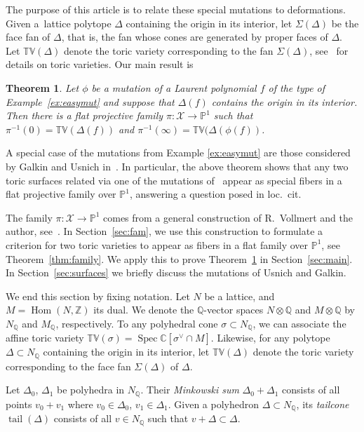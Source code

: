 \documentclass[11pt]{article}
\newcommand{\CC}{\mathbb{C}}
\newcommand{\QQ}{\mathbb{Q}}
\newcommand{\ZZ}{\mathbb Z}
\newcommand{\PP}{\mathbb{P}}
\newcommand{\tv}{\mathbb{TV}}
\newcommand{\cX}{\mathcal{X}}
\DeclareMathOperator{\spec}{Spec}
\DeclareMathOperator{\tail}{tail}
\DeclareMathOperator{\Hom}{Hom}
\newtheorem{Theorem}{Theorem}[section]
 { \theoremstyle{definition}
\newtheorem{Definition}[Theorem]{Definition}
\newtheorem{Example}[Theorem]{Example}
\newtheorem{Remark}[Theorem]{Remark} }
\begin{document}
The purpose of this article is to relate these special mutations to deformations. Given a~lattice polytope $\Delta$ containing the origin in its interior, let
$\Sigma(\Delta)$ be the face fan of $\Delta$, that is, the fan whose cones are generated by proper faces of $\Delta$. Let $\tv(\Delta)$ denote the toric variety corresponding to the fan $\Sigma(\Delta)$, see~\cite{fulton:93a} for details on toric varieties.  Our main result is

\begin{Theorem}\label{thm:main}
	Let $\phi$ be a mutation of a Laurent polynomial $f$ of the type of Example~{\rm \ref{ex:easymut}} and suppose that $\Delta(f)$ contains the origin in its interior. Then there is a flat projective family $\pi\colon \cX\to\PP^1$ such that $\pi^{-1}(0)=\tv(\Delta(f))$ and $\pi^{-1}(\infty)=\tv(\Delta(\phi(f))$.
\end{Theorem}


A special case of the mutations from Example \ref{ex:easymut} are those considered by Galkin and Usnich in~\cite{galkin}. In particular, the above theorem shows that any two toric surfaces related via one of the mutations of~\cite{galkin} appear as special f\/ibers in a f\/lat projective family over $\PP^1$, answering a question posed in loc.~cit.

The family $\pi\colon \cX\to\PP^1$  comes from a general construction of R.~Vollmert and the author, see~\cite{ilten:09b}. In Section~\ref{sec:fam}, we use this construction to formulate a criterion for two toric varieties to appear as f\/ibers in a f\/lat family over $\PP^1$, see Theorem~\ref{thm:family}.
We apply this to prove Theorem~\ref{thm:main} in Section~\ref{sec:main}. In Section~\ref{sec:surfaces} we brief\/ly discuss the mutations of Usnich and Galkin.


We end this section by f\/ixing notation. Let $N$ be a lattice, and $M=\Hom(N,\ZZ)$ its dual. We denote the $\QQ$-vector spaces $N\otimes \QQ$ and $M\otimes \QQ$ by $N_\QQ$ and $M_\QQ$, respectively. To any polyhedral cone $\sigma\subset N_\QQ$, we can associate the af\/f\/ine toric variety $\tv(\sigma)=\spec \CC[\sigma^\vee\cap M]$. Likewise, for any polytope $\Delta\subset N_\QQ$ containing the origin in its interior, let $\tv(\Delta)$ denote the toric variety corresponding to the face fan $\Sigma(\Delta)$ of $\Delta$.

Let $\Delta_0$, $\Delta_1$ be polyhedra in $N_\QQ$. Their \emph{Minkowski sum} $\Delta_0+\Delta_1$ consists of all points $v_0+v_1$ where $v_0\in\Delta_0$, $v_1\in\Delta_1$. Given a polyhedron $\Delta\subset N_\QQ$, its \emph{tailcone} $\tail(\Delta)$ consists of all $v\in N_\QQ$ such that $v+\Delta\subset \Delta$.
\end{document}
